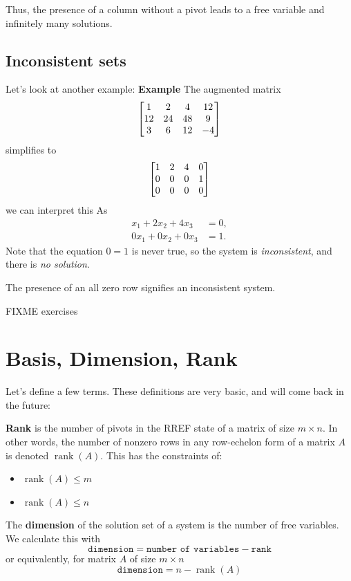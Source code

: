 Thus, the presence of a column without a pivot leads to a free variable and infinitely many solutions.

\subsection{Inconsistent sets}
Let's look at another example:
\textbf{Example}
The augmented matrix
$$\begin{bmatrix} 
1&2&4&12\\
12&24&48&9\\
3&6&12&-4
 \end{bmatrix}$$
simplifies to 
$$\begin{bmatrix} 
1&2&4&0\\
0&0&0&1\\
0&0&0&0 \end{bmatrix}$$
we can interpret this As
$$\begin{aligned}
x_1 + 2x_2 + 4x_3 &= 0,\\
0x_1 + 0x_2 + 0x_3 &= 1.
\end{aligned}$$
Note that the equation $0=1$ is never true, so the system is \emph{inconsistent}, and there is \emph{no solution}.

The presence of an all zero row signifies an inconsistent system.


FIXME exercises
\section{Basis, Dimension, Rank}
Let's define a few terms. These definitions are very basic, and will come back in the future:

\begin{mdframed}[frametitle = {Rank}, style = important]
\textbf{Rank} is the number of pivots in the RREF state of a matrix of size $m \times n$.
In other words, the number of nonzero rows in any row-echelon form of a matrix $A$ is denoted $\operatorname{rank}(A)$.
This has the constraints of:
\begin{itemize}
       \item $\operatorname{rank}(A) \le m$
       \item $\operatorname{rank}(A) \le n$
\end{itemize}
\end{mdframed}

\begin{mdframed}[frametitle = {Dimension}, style = important]
The \textbf{dimension} of the solution set of a system is the number of free variables. 
We calculate this with
$$\texttt{dimension} = \texttt{number of variables}-\texttt{rank}$$
or equivalently, for matrix $A$ of size $m \times n$
$$\texttt{dimension} = n - \operatorname{rank}(A)$$
\end{mdframed}

